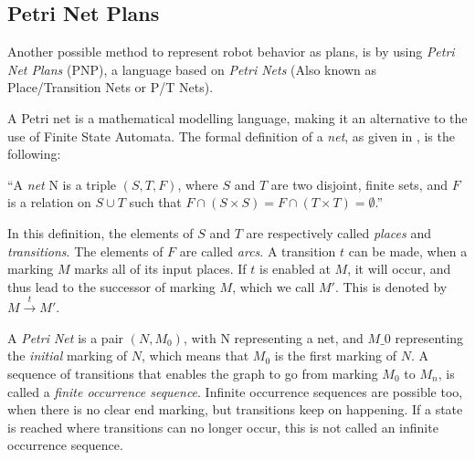 \documentclass[a4paper,10pt]{article}
\begin{document}
\subsection{Petri Net Plans}
Another possible method to represent robot behavior as plans, is by using
\textit{Petri Net Plans} (PNP), a language based on \textit{Petri Nets} (Also known as
Place/Transition Nets or P/T Nets).

A Petri net is a mathematical modelling language, making it an alternative to
the use of Finite State Automata. The formal definition of a \textit{net}, as given
in \cite{esparza1994decidability}, is the following:

``A \textit{net} N is a triple $(S, T, F)$, where $S$ and $T$ are two disjoint,
finite sets, and $F$ is a relation on $S \cup T$ such that $F \cap (S \times S)
= F \cap (T \times T) = \emptyset$.''

In this definition, the elements of $S$ and $T$ are respectively called
\textit{places} and \textit{transitions}. The elements of $F$ are called
\textit{arcs}. A transition $t$ can be made, when a marking $M$ marks all of its
input places. If $t$ is enabled at $M$, it will occur, and thus lead to the
successor of marking $M$, which we call $M'$. This is denoted by $ M
\stackrel{t}{\longrightarrow} M'$. 

A \textit{Petri Net} is a pair $(N, M_0)$, with N representing a net, and
$M\_0$ representing the \textit{initial} marking of $N$, which means that $M_0$
is the first marking of $N$. A sequence of transitions that enables the graph to
go from marking $M_0$ to $M_n$, is called a \textit{finite occurrence
sequence}.  Infinite occurrence sequences are possible too, when there is no
clear end marking, but transitions keep on happening. If a state is reached
where transitions can no longer occur, this is not called an infinite occurrence
sequence. 
\end{document}
